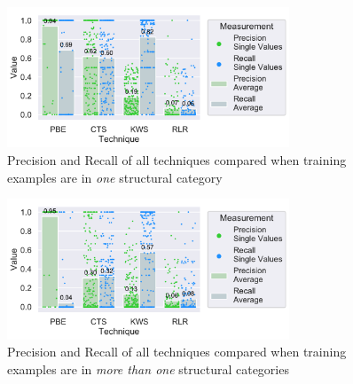 \documentclass[\myrootdir/main.tex]{subfiles}
\begin{document}
\begin{figure}[htbp]
	\centering
		\includegraphics[width=0.75\textwidth, clip]{img/big-study/recall-precision-singlecategory-all.pdf}
		\caption{Precision and Recall of all techniques compared when training examples are in \emph{one} structural category}
		\label{fig:recall-precision-singlecategory-all}
\end{figure}

\begin{figure}[htbp]
		\centering
		\includegraphics[width=0.75\textwidth, clip]{img/big-study/recall-precision-multicategory-all.pdf}
		\caption{Precision and Recall of all techniques compared when training examples are in \emph{more than one} structural categories}
		\label{fig:recall-precision-multicategory-all}
\end{figure}

\end{document}
